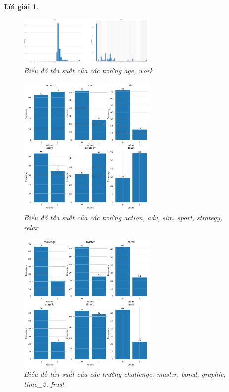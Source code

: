\documentclass[14pt, a4paper]{article}
\theoremstyle{sltheorem}
\theoremstyle{soltheorem}
\newtheorem*{loigiai}{Lời giải}
\begin{document}
\begin{loigiai}
    \begin{figure}[h!]
        \centering
        \includegraphics[width=0.6\textwidth]{3.png}
        \caption{Biểu đồ tần suất của các trường age, work}
        \label{fig:3}
    \end{figure}

    \begin{figure}[h!]
        \centering
        \includegraphics[width=0.6\textwidth]{4.png}
        \caption{Biểu đồ tần suất của các trường action, adv, sim, sport, strategy, relax}
        \label{fig:4}
    \end{figure}

    \begin{figure}[h!]
        \centering
        \includegraphics[width=0.6\textwidth]{5.png}
        \caption{Biểu đồ tần suất của các trường challenge, master, bored, graphic, time\_2, frust}
        \label{fig:5}
    \end{figure}


\end{loigiai}
\end{document}
